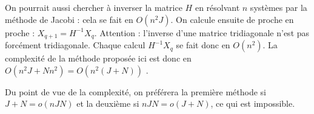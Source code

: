 On pourrait aussi chercher à inverser la matrice $H$ en résolvant $n$ systèmes par la méthode de Jacobi : cela se fait en $O(n^2J)$. 
On calcule ensuite de proche en proche  : $X_{q+1} = H^{-1}X_q$.
Attention : l'inverse d'une matrice tridiagonale n'est pas forcément tridiagonale. 
Chaque calcul $H^{-1}X_q$ se fait donc en $O(n^2)$. 
La complexité de la méthode proposée ici est donc en $O(n^2J + Nn^2) = O(n^2(J+N))$ . 

Du point de vue de la complexité, on préférera la première méthode si $J+N = o(nJN)$  et la deuxième si $nJN = o(J+N)$, ce qui est impossible.